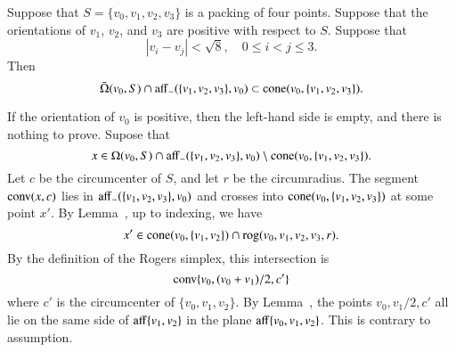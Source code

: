 \begin{tarskidata}
\begin{tarski}

\begin{lemma}
Suppose that $S=\{v_0,v_1,v_2,v_3\}$ is a packing
of four points.  Suppose that
the orientations of $v_1$, $v_2$, and $v_3$ are positive with respect
to $S$.  Suppose that
  $$
  |v_i - v_j | < \sqrt8, \quad 0\le i < j \le 3.
  $$
Then
  $$
  \bar\Omega(v_0,S) \cap {\operatorname{aff}}_-(\{v_1,v_2,v_3\},v_0) \subset
  {\operatorname{cone}}(v_0,\{v_1,v_2,v_3\}).
  $$
\end{lemma}




\begin{proved}  If the orientation of $v_0$ is positive,
then the left-hand side is empty, and there is nothing to prove.
Supose that 
 $$x\in
   \Omega(v_0,S) \cap {\operatorname{aff}}_-(\{v_1,v_2,v_3\},v_0)
   \setminus
  {\operatorname{cone}}(v_0,\{v_1,v_2,v_3\}).
 $$
Let $c$ be the circumcenter of $S$, and let $r$ be the
circumradius.  The segment ${\operatorname{conv}}(x,c)$
lies in ${\operatorname{aff}}_-(\{v_1,v_2,v_3\},v_0)$ and crosses into
${\operatorname{cone}}(v_0,\{v_1,v_2,v_3\})$ at some point $x'$.  
By Lemma~, up to indexing,
we have 
  $$x'\in{\operatorname{cone}}(v_0,\{v_1,v_2\})\cap{\operatorname{rog}}(v_0,v_1,v_2,v_3,r).$$
By the definition of the Rogers simplex, this intersection is
  $${\operatorname{conv}}\{v_0,(v_0+v_1)/2,c'\}$$
where $c'$ is the circumcenter of $\{v_0,v_1,v_2\}$.
By Lemma~, the points $v_0,v_1/2,c'$ all lie
on the same side of ${\operatorname{aff}}\{v_1,v_2\}$ in the plane ${\operatorname{aff}}\{v_0,v_1,v_2\}$.  This is contrary to assumption.
\swallowed\end{proved}
\end{tarski}



\begin{tarski}


\end{tarski}
\end{tarskidata}
